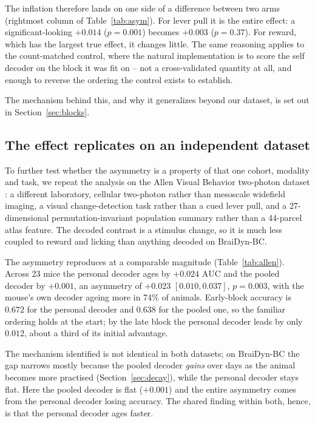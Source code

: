 \documentclass[mlmain,onecolumn]{jmlr}
\newcommand{\auc}{\mathrm{AUC}}
\begin{document}
The inflation therefore lands on one side of a difference between two arms (rightmost column of
Table~\ref{tab:asym}). For lever pull it is the entire effect: a significant-looking $+0.014$
($p = 0.001$) becomes $+0.003$ ($p = 0.37$). For reward, which has the largest true effect, it
changes little. The same reasoning applies to the count-matched control, where the natural
implementation is to score the self decoder on the block it was fit on -- not a cross-validated
quantity at all, and enough to reverse the ordering the control exists to establish.

The mechanism behind this, and why it generalizes beyond our dataset, is set out in
Section~\ref{sec:blocks}.

\subsection{The effect replicates on an independent dataset}
\label{sec:allen}
To further test whether the asymmetry is a property of that one cohort, modality and task, we
repeat the analysis on the Allen Visual Behavior two-photon dataset \citep{allenvb2023}: a different
laboratory, cellular two-photon rather than mesoscale widefield imaging, a visual change-detection
task rather than a cued lever pull, and a 27-dimensional permutation-invariant population summary
rather than a 44-parcel atlas feature. The decoded contrast is a stimulus change, so it is much less
coupled to reward and licking than anything decoded on BraiDyn-BC.

The asymmetry reproduces at a comparable magnitude (Table~\ref{tab:allen}). Across 23 mice the
personal decoder ages by $+0.024$ $\auc$ and the pooled decoder by $+0.001$, an asymmetry of
$+0.023$ $[0.010, 0.037]$, $p = 0.003$, with the mouse's own decoder ageing more in 74\% of animals.
Early-block accuracy is $0.672$ for the personal decoder and $0.638$ for the pooled one, so the
familiar ordering holds at the start; by the late block the personal decoder leads by only $0.012$,
about a third of its initial advantage.

The mechanism identified is not identical in both datasets; on BraiDyn-BC the gap narrows
mostly because the pooled decoder \emph{gains} over days as the animal becomes more practised
(Section~\ref{sec:decay}), while the personal decoder stays flat. Here the pooled decoder is flat
($+0.001$) and the entire asymmetry comes from the personal decoder losing accuracy. The shared
finding within both, hence, is that the personal decoder ages faster.
\end{document}
